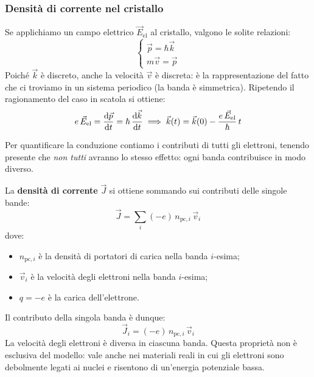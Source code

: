 \subsubsection{Densità di corrente nel cristallo}

Se applichiamo un campo elettrico \(\vec{E}_{\text{el}}\) al cristallo, valgono le solite relazioni:
\begin{equation}
    \begin{cases}
        \vec{p} = \hbar \vec{k} \\
        m \vec{v} = \vec{p}
    \end{cases}
\end{equation}
Poiché \(\vec{k}\) è discreto, anche la velocità \(\vec{v}\) è discreta: è la rappresentazione del fatto che ci troviamo in un sistema periodico (la banda è simmetrica). Ripetendo il ragionamento del caso in scatola si ottiene:
\begin{equation}
    e\, \vec{E}_{\text{el}} = \dv{\vec{p}}{t} = \hbar\, \dv{\vec{k}}{t}
    \implies
    \vec{k}(t) = \vec{k}(0) - \frac{e\, \vec{E}_{\text{el}}}{\hbar}\, t
\end{equation}

Per quantificare la conduzione contiamo i contributi di tutti gli elettroni, tenendo presente che \emph{non tutti} avranno lo stesso effetto: ogni banda contribuisce in modo diverso.

La \textbf{densità di corrente} \(\vec{J}\) si ottiene sommando sui contributi delle singole bande:
\begin{equation}
    \vec{J} = \sum_i (-e)\, n_{\text{pc}, i}\, \vec{v}_i
\end{equation}
dove:
\begin{itemize}
    \item \(n_{\text{pc}, i}\) è la densità di portatori di carica nella banda \(i\)-esima;
    \item \(\vec{v}_i\) è la velocità degli elettroni nella banda \(i\)-esima;
    \item \(q = -e\) è la carica dell'elettrone.
\end{itemize}
Il contributo della singola banda è dunque:
\begin{equation}
    \vec{J}_i = (-e)\, n_{\text{pc}, i}\, \vec{v}_i
\end{equation}
La velocità degli elettroni è diversa in ciascuna banda. Questa proprietà non è esclusiva del modello: vale anche nei materiali reali in cui gli elettroni sono debolmente legati ai nuclei e risentono di un'energia potenziale bassa.

